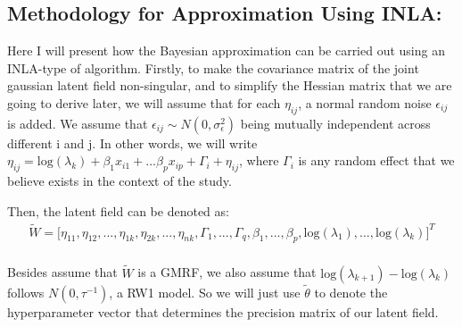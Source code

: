 \documentclass[]{article}
\begin{document}
\hypertarget{methodology-for-approximation-using-inla}{%
\subsection{Methodology for Approximation Using
INLA:}\label{methodology-for-approximation-using-inla}}

Here I will present how the Bayesian approximation can be carried out
using an INLA-type of algorithm. Firstly, to make the covariance matrix
of the joint gaussian latent field non-singular, and to simplify the
Hessian matrix that we are going to derive later, we will assume that
for each \(\eta_{ij}\), a normal random noise \(\epsilon_{ij}\) is
added. We assume that \(\epsilon_{ij} \sim N(0,\sigma^2_{\epsilon})\)
being mutually independent across different i and j. In other words, we
will write
\(\eta_{ij} = \text{log}(\lambda_k)+\beta_1x_{i1}+...\beta_px_{ip} + \Gamma_i+\eta_{ij}\),
where \(\Gamma_i\) is any random effect that we believe exists in the
context of the study.

Then, the latent field can be denoted as:
\begin{equation}\begin{aligned}\label{eqn:field1}
\tilde W = \big[\eta_{11},\eta_{12},...,\eta_{1k},\eta_{2k},...,\eta_{nk},\Gamma_1,...,\Gamma_q,\beta_1,...,\beta_p,\text{log}(\lambda_1),...,\text{log}(\lambda_k)\big]^T\\
\end{aligned}\end{equation}

Besides assume that \(\tilde W\) is a GMRF, we also assume that
\(\text{log}(\lambda_{k+1})-\text{log}(\lambda_k)\) follows
\(N(0,\tau^{-1})\), a RW1 model. So we will just use \(\tilde \theta\)
to denote the hyperparameter vector that determines the precision matrix
of our latent field.
\end{document}
